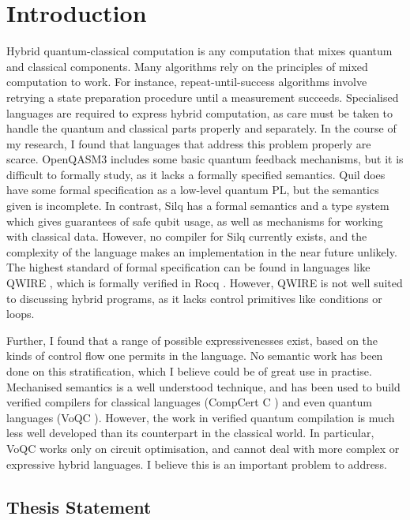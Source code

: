 
\section{Introduction}

Hybrid quantum-classical computation is any computation that mixes quantum and classical components.
% 
Many algorithms rely on the principles of mixed computation to work.
% 
For instance, repeat-until-success algorithms involve retrying a state preparation procedure
until a measurement succeeds. 
% 
Specialised languages are required to express hybrid computation, 
as care must be taken to handle the quantum and classical parts properly and separately. 
% 
In the course of my research, I found that languages that address this problem properly are scarce. 
% 
OpenQASM3 \cite{Cross_2022_OpenQASM3} includes some basic quantum feedback mechanisms, but it is difficult to formally study,
as it lacks a formally specified semantics.
% 
Quil \cite{Smith_2016_Quil} does have some formal specification as a low-level quantum PL, but the semantics given is incomplete.
% 
In contrast, Silq \cite{Bichsel_2020_Silq} has a formal semantics and a type system which gives guarantees of safe qubit usage,
as well as mechanisms for working with classical data.
% 
However, no compiler for Silq currently exists, and the complexity of the language makes 
an implementation in the near future unlikely.
% 
The highest standard of formal specification can be found in languages like QWIRE \cite{Paykin_2017_QWIRE, Rand_2019_ReQWIRE},
which is formally verified in Rocq \cite{rocq}.
%
However, QWIRE is not well suited to discussing hybrid programs, as it lacks control primitives like conditions or loops.


Further, I found that a range of possible expressivenesses exist, based on the kinds of control flow one permits in the language.
% 
No semantic work has been done on this stratification, which I believe could be of great use in practise.
% 
Mechanised semantics is a well understood technique, and has been used to build verified compilers
for classical languages (CompCert C \cite{Leroy_2016_compcert}) and even quantum languages (VoQC \cite{Hietala_2023_voqc}).
% 
However, the work in verified quantum compilation is much less well developed than its counterpart in the classical world.
% 
In particular, VoQC works only on circuit optimisation, and cannot deal with more complex or expressive hybrid languages.
% 
I believe this is an important problem to address.


\subsection{Thesis Statement}

